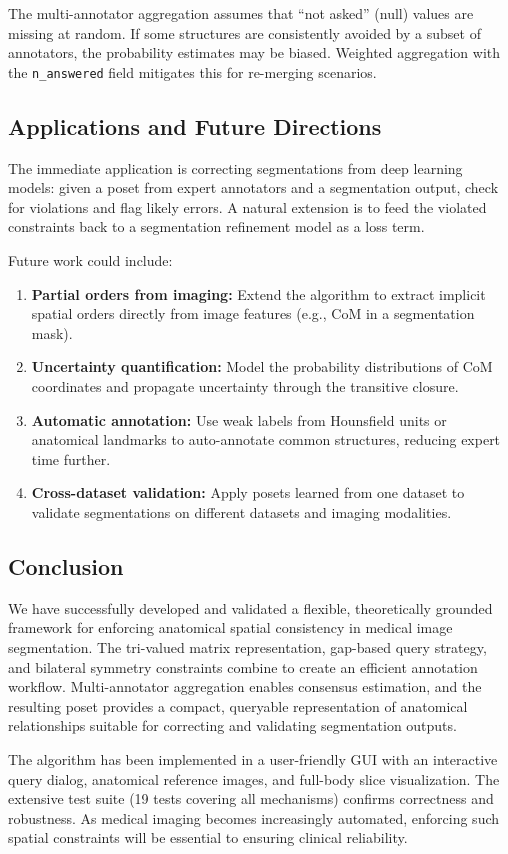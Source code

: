 \documentclass[12pt,a4paper]{article}
\begin{document}
The multi-annotator aggregation assumes that ``not asked'' (null) values are missing at random. If some structures are consistently avoided by a subset of annotators, the probability estimates may be biased. Weighted aggregation with the \texttt{n\_answered} field mitigates this for re-merging scenarios.

\subsection{Applications and Future Directions}

The immediate application is correcting segmentations from deep learning models: given a poset from expert annotators and a segmentation output, check for violations and flag likely errors. A natural extension is to feed the violated constraints back to a segmentation refinement model as a loss term.

Future work could include:
\begin{enumerate}
  \item \textbf{Partial orders from imaging:} Extend the algorithm to extract implicit spatial orders directly from image features (e.g., CoM in a segmentation mask).
  \item \textbf{Uncertainty quantification:} Model the probability distributions of CoM coordinates and propagate uncertainty through the transitive closure.
  \item \textbf{Automatic annotation:} Use weak labels from Hounsfield units or anatomical landmarks to auto-annotate common structures, reducing expert time further.
  \item \textbf{Cross-dataset validation:} Apply posets learned from one dataset to validate segmentations on different datasets and imaging modalities.
\end{enumerate}

\subsection{Conclusion}

We have successfully developed and validated a flexible, theoretically grounded framework for enforcing anatomical spatial consistency in medical image segmentation. The tri-valued matrix representation, gap-based query strategy, and bilateral symmetry constraints combine to create an efficient annotation workflow. Multi-annotator aggregation enables consensus estimation, and the resulting poset provides a compact, queryable representation of anatomical relationships suitable for correcting and validating segmentation outputs.

The algorithm has been implemented in a user-friendly GUI with an interactive query dialog, anatomical reference images, and full-body slice visualization. The extensive test suite (19 tests covering all mechanisms) confirms correctness and robustness. As medical imaging becomes increasingly automated, enforcing such spatial constraints will be essential to ensuring clinical reliability.
\end{document}
